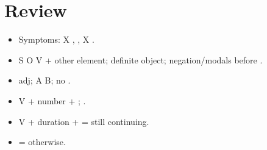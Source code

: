 \section*{Review}
\begin{itemize}
  \item Symptoms: X , ,  X .
  \item S  O V + other element; definite object; negation/modals before .
  \item {} adj;  A  B; no .
  \item V + number + ; .
  \item V + duration +  = still continuing.
  \item {} = otherwise.
\end{itemize}
